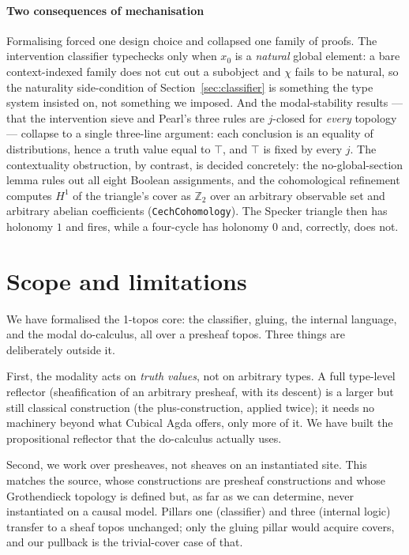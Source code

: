 \documentclass{lmcs}
\begin{document}
\paragraph{Two consequences of mechanisation}
Formalising forced one design choice and collapsed one family of proofs.
The intervention classifier typechecks only when $x_0$ is a \emph{natural} global element: a bare context-indexed family does not cut out a subobject and $\chi$ fails to be natural, so the naturality side-condition of Section~\ref{sec:classifier} is something the type system insisted on, not something we imposed.
And the modal-stability results --- that the intervention sieve and Pearl's three rules are $j$-closed for \emph{every} topology --- collapse to a single three-line argument: each conclusion is an equality of distributions, hence a truth value equal to $\top$, and $\top$ is fixed by every $j$.
The contextuality obstruction, by contrast, is decided concretely: the no-global-section lemma rules out all eight Boolean assignments, and the cohomological refinement computes $H^1$ of the triangle's cover as $\mathbb{Z}_2$ over an arbitrary observable set and arbitrary abelian coefficients (\texttt{CechCohomology}). The Specker triangle then has holonomy $1$ and fires, while a four-cycle has holonomy $0$ and, correctly, does not.

\section{Scope and limitations}\label{sec:scope}

We have formalised the 1-topos core: the classifier, gluing, the internal language, and the modal do-calculus, all over a presheaf topos.
Three things are deliberately outside it.

First, the modality acts on \emph{truth values}, not on arbitrary types.
A full type-level reflector (sheafification of an arbitrary presheaf, with its descent) is a larger but still classical construction (the plus-construction, applied twice); it needs no machinery beyond what Cubical Agda offers, only more of it.
We have built the propositional reflector that the do-calculus actually uses.

Second, we work over presheaves, not sheaves on an instantiated site.
This matches the source, whose constructions are presheaf constructions and whose Grothendieck topology is defined but, as far as we can determine, never instantiated on a causal model.
Pillars one (classifier) and three (internal logic) transfer to a sheaf topos unchanged; only the gluing pillar would acquire covers, and our pullback is the trivial-cover case of that.
\end{document}

